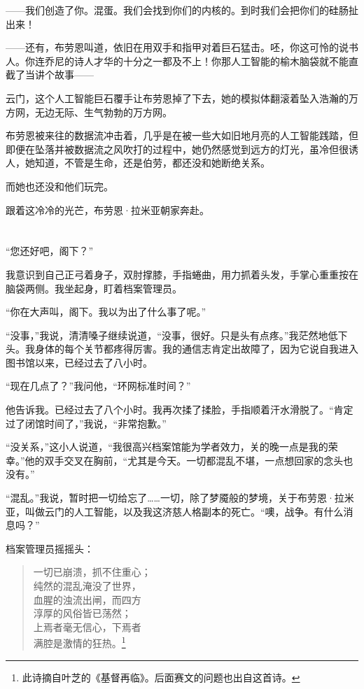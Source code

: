 \documentclass[AutoFakeBold=true]{book}
\begin{document}
{\heiti [我很怀疑]}

{\kaishu ——我们创造了你。混蛋。我们会找到你们的内核的。到时我们会把你们的硅肠扯出来！}

{}

{\kaishu ——还有，}布劳恩叫道，依旧在用双手和指甲对着巨石猛击。{\kaishu 呸，你这可怜的说书人。你连乔尼的诗人才华的十分之一都及不上！你那人工智能的榆木脑袋就不能直截了当讲个故事——}

{\heiti [快走吧]}

云门，这个人工智能巨石覆手让布劳恩掉了下去，她的模拟体翻滚着坠入浩瀚的万方网，无边无际、生气勃勃的万方网。

布劳恩被来往的数据流冲击着，几乎是在被一些大如旧地月亮的人工智能践踏，但即便在坠落并被数据流之风吹打的过程中，她仍然感觉到远方的灯光，虽冷但很诱人，她知道，不管是生命，还是伯劳，都还没和她断绝关系。

而她也还没和他们玩完。

跟着这冷冷的光芒，布劳恩·拉米亚朝家奔赴。

\chapter{}

``您还好吧，阁下？''

我意识到自己正弓着身子，双肘撑膝，手指蜷曲，用力抓着头发，手掌心重重按在脑袋两侧。我坐起身，盯着档案管理员。

``你在大声叫，阁下。我以为出了什么事了呢。''

``没事，''我说，清清嗓子继续说道，``没事，很好。只是头有点疼。''我茫然地低下头。我身体的每个关节都疼得厉害。我的通信志肯定出故障了，因为它说自我进入图书馆以来，已经过去了八小时。

``现在几点了？''我问他，``环网标准时间？''

他告诉我。已经过去了八个小时。我再次揉了揉脸，手指顺着汗水滑脱了。``肯定过了闭馆时间了，''我说，``非常抱歉。''

``没关系，''这小人说道，``我很高兴档案馆能为学者效力，关的晚一点是我的荣幸。''他的双手交叉在胸前，``尤其是今天。一切都混乱不堪，一点想回家的念头也没有。''

``混乱。''我说，暂时把一切给忘了……一切，除了梦魇般的梦境，关于布劳恩·拉米亚，叫做云门的人工智能，以及我这济慈人格副本的死亡。``噢，战争。有什么消息吗？''

档案管理员摇摇头：

\begin{quote}
	{\kaishu 一切已崩溃，抓不住重心；\\
	纯然的混乱淹没了世界，\\
	血腥的浊流出闸，而四方\\
	淳厚的风俗皆已荡然；\\
	上焉者毫无信心，下焉者\\
	满腔是激情的狂热。}\footnote{此诗摘自叶芝的《基督再临》。后面赛文的问题也出自这首诗。}
\end{quote}
\end{document}
